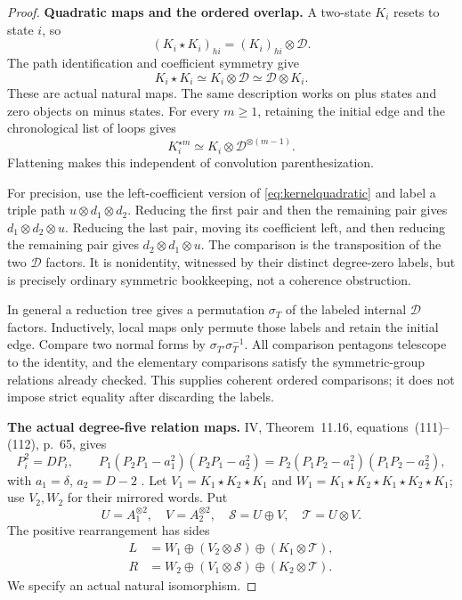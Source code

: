 \begin{proof}
\par\smallskip\noindent\textbf{Quadratic maps and the ordered overlap.}\quad
A two-state $K_i$ resets to state $i$, so
\[
 (K_i\star K_i)_{hi}=(K_i)_{hi}\otimes\mathcal D.
\]
The path identification and coefficient symmetry give
\begin{equation}\label{eq:kernelquadratic}
 K_i\star K_i\simeq K_i\otimes\mathcal D
                   \simeq\mathcal D\otimes K_i.
\end{equation}
These are actual natural maps.
The same description works on plus states and zero
objects on minus states.
For every $m\ge1$, retaining the initial edge and the
chronological list of loops gives
\[
 K_i^{\star m}\simeq
 K_i\otimes\mathcal D^{\otimes(m-1)}.
\]
Flattening makes this independent of convolution
parenthesization.

For precision, use the left-coefficient version of
\eqref{eq:kernelquadratic} and label a triple path
$u\otimes d_1\otimes d_2$.
Reducing the first pair and then the remaining pair
gives $d_1\otimes d_2\otimes u$.
Reducing the last pair, moving its coefficient left,
and then reducing the remaining pair gives
$d_2\otimes d_1\otimes u$.
The comparison is the transposition of the two
$\mathcal D$ factors.
It is nonidentity, witnessed by their distinct
degree-zero labels, but is precisely ordinary
symmetric bookkeeping, not a coherence obstruction.

In general a reduction tree gives a permutation
$\sigma_T$ of the labeled internal $\mathcal D$ factors.
Inductively, local maps only permute those labels and
retain the initial edge.
Compare two normal forms by
$\sigma_{T'}\sigma_T^{-1}$.
All comparison pentagons telescope to the identity,
and the elementary comparisons satisfy the symmetric-group
relations already checked.
This supplies coherent ordered comparisons; it does not
impose strict equality after discarding the labels.

\par\smallskip\noindent\textbf{The actual degree-five relation maps.}\quad
IV, Theorem~11.16, equations~(111)--(112), p.~65, gives
\[
 P_i^2=DP_i,\qquad
 P_1(P_2P_1-a_1^2)(P_2P_1-a_2^2)
 =
 P_2(P_1P_2-a_1^2)(P_1P_2-a_2^2),
\]
with $a_1=\delta$, $a_2=D-2$ \cite{IV}.
Let $V_1=K_1\star K_2\star K_1$ and
$W_1=K_1\star K_2\star K_1\star K_2\star K_1$;
use $V_2,W_2$ for their mirrored words.
Put
\[
 U=A_1^{\otimes2},\quad V=A_2^{\otimes2},\quad
 \mathcal S=U\oplus V,\quad \mathcal T=U\otimes V.
\]
The positive rearrangement has sides
\begin{align}
 L&=W_1\oplus(V_2\otimes\mathcal S)
                         \oplus(K_1\otimes\mathcal T),\nonumber\\
 R&=W_2\oplus(V_1\otimes\mathcal S)
                         \oplus(K_2\otimes\mathcal T).
 \label{eq:kerneldegreefive}
\end{align}
We specify an actual natural isomorphism.


\end{proof}
